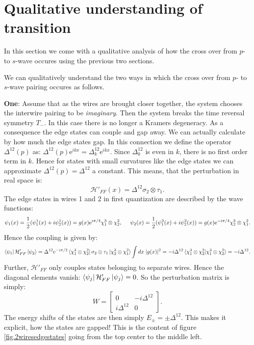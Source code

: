 \section{Qualitative understanding of transition}
\label{sec.2wirestransitionqualitative}
In this section we come with a qualitative analysis of how the cross over from $p$- to $s$-wave occures using the previous two sections. 

We can qualitatively understand the two ways in which the cross over from $p$- to $s$-wave pairing occures as follows. 

\textbf{One}: Assume that as the wires are brought closer together, the system chooses the interwire pairing to be \textit{imaginary}. Then the system breaks the time reversal symmetry $T_-$. In this case there is no longer a Kramers degeneracy. As a consequence the edge states can couple and gap away. We can actually calculate by how much the edge states gap. In this connection we define the operator $\Delta^{12}(p)$ as: $\Delta^{12}(p)\text{e}^{ikx} = \Delta^{12}_k\text{e}^{ikx}$. Since $\Delta^{12}_k$ is even in $k$, there is no first order term in $k$. Hence for states with small curvatures like the edge states we can approximate $\Delta^{12}(p) = \Delta^{12}$ a constant. This means, that the perturbation in real space is:
\begin{equation}
\mathcal{H}'_{FF}(x) = \Delta^{12} \sigma_2\otimes \tau_1. 
\label{eq.interwirepairingrealspace}
\end{equation}
The edge states in wires 1 and 2 in first quantization are described by the wave functions:
\begin{equation}
\psi_1(x) = \frac{1}{2}(\psi^1_1(x) + i\psi^1_2(x)) = g(x)\text{e}^{i\pi/4}\chi^3_1\otimes\chi^2_2, \hspace{0.5cm} \psi_2(x) = \frac{1}{2}(\psi^2_1(x) + i\psi^2_2(x)) = g(x)\text{e}^{-i\pi/4}\chi^3_2\otimes\chi^2_1. \nonumber
\end{equation} 
Hence the coupling is given by:
\begin{equation}
\bra{\psi_1}\mathcal{H}'_{FF}\ket{\psi_2} = \Delta^{12}\text{e}^{-i\pi/2}\bra{\chi^3_1\otimes\chi^2_2}\sigma_2\otimes \tau_1\ket{\chi^3_2\otimes\chi^2_1}\int dx \; |g(x)|^2 = -i\Delta^{12}\braket{\chi^3_1\otimes\chi^2_2 | \chi^3_1\otimes\chi^2_2} = -i\Delta^{12}. \nonumber
\end{equation}
Further, $\mathcal{H}'_{FF}$ only couples states belonging to separate wires. Hence the diagonal elements vanish: $\bra{\psi_j}\mathcal{H}'_{FF}\ket{\psi_j} = 0$. So the perturbation matrix is simply:
\begin{equation}
W = \begin{bmatrix} 0 & -i\Delta^{12} \\ i\Delta^{12} & 0 \end{bmatrix}. \nonumber
\end{equation}
The energy shifts of the states are then simply $E_{\pm} = \pm \Delta^{12}$. This makes it explicit, how the states are gapped! This is the content of figure \ref{fig.2wiresedgestates} going from the top center to the middle left. 

